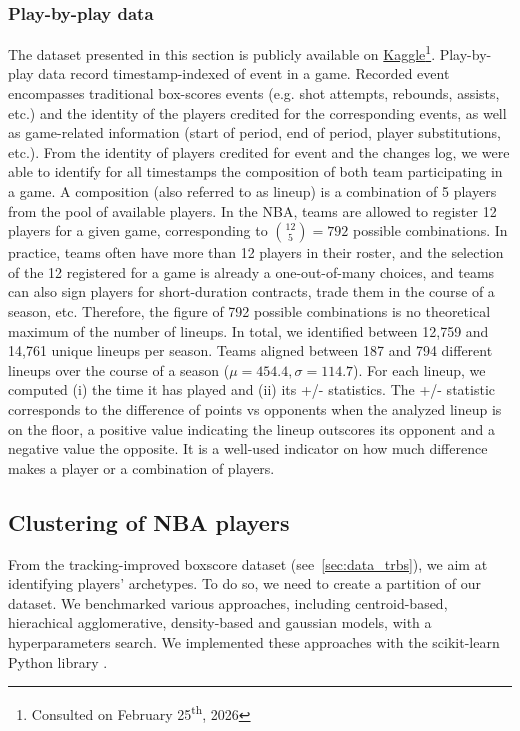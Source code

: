\subsubsection{Play-by-play data}
\label{sec:data_pbp}

The dataset presented in this section is publicly available on \href{https://www.kaggle.com/datasets/schmadam97/nba-playbyplay-data-20182019}{Kaggle}\footnote{Consulted on February 25\textsuperscript{th}, 2026}.
Play-by-play data record timestamp-indexed of event in a game. 
Recorded event encompasses traditional box-scores events (e.g. shot attempts, rebounds, assists, etc.) and the identity of the players credited for the corresponding events, as well as game-related information (start of period, end of period, player substitutions, etc.).
From the identity of players credited for event and the changes log, we were able to identify for all timestamps the composition of both team participating in a game. 
A composition (also referred to as lineup) is a combination of 5 players from the pool of available players.
In the NBA, teams are allowed to register 12 players for a given game, corresponding to $\binom{12}{5} = 792$ possible combinations.
In practice, teams often have more than 12 players in their roster, and the selection of the 12 registered for a game is already a one-out-of-many choices, and teams can also sign players for short-duration contracts, trade them in the course of a season, etc.
Therefore, the figure of 792 possible combinations is no theoretical maximum of the number of lineups.
In total, we identified between 12,759 and 14,761 unique lineups per season.
Teams aligned between 187 and 794 different lineups over the course of a season ($\mu = 454.4, \sigma = 114.7$).  
For each lineup, we computed (i) the time it has played and (ii) its +/- statistics.
The +/- statistic corresponds to the difference of points vs opponents when the analyzed lineup is on the floor, a positive value indicating the lineup outscores its opponent and a negative value the opposite. 
It is a well-used indicator on how much difference makes a player or a combination of players. 

\subsection{Clustering of NBA players}
\label{sec:clustering}

From the tracking-improved boxscore dataset (see~\ref{sec:data_trbs}), we aim at identifying players' archetypes.
To do so, we need to create a partition of our dataset.
We benchmarked various approaches, including centroid-based, hierachical agglomerative, density-based and gaussian models, with a hyperparameters search. 
We implemented these approaches with the scikit-learn Python library \citep{scikit-learn}.

